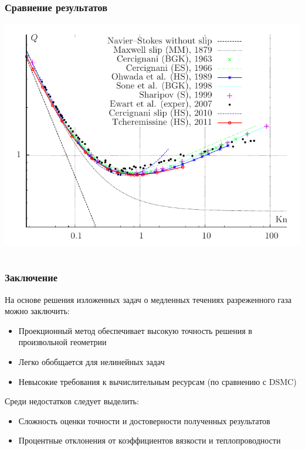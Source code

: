 \documentclass[ucs]{beamer}
\begin{document}
\begin{frame}
	\frametitle{Сравнение результатов}
	\begin{center}
		\includegraphics[width=.9\textwidth]{pics/poise.pdf}
	\end{center}
\end{frame}

\section*{}
\begin{frame}
	\frametitle{Заключение}
	На основе решения изложенных задач о медленных течениях разреженного газа можно заключить:
	\begin{itemize}
		\item Проекционный метод обеспечивает высокую точность решения в произвольной геометрии \\
		\item Легко обобщается для нелинейных задач \\
		\item Невысокие требования к вычислительным ресурсам (по сравнению с DSMC) \\
	\end{itemize}
	Среди недостатков следует выделить:
	\begin{itemize}
		\item Сложность оценки точности и достоверности полученных результатов \\
		\item Процентные отклонения от коэффициентов вязкости и теплопроводности \\
	\end{itemize}
\end{frame}
\end{document}
